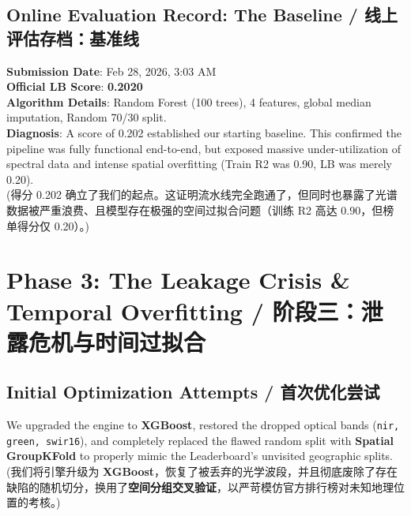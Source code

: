 \subsection{Online Evaluation Record: The Baseline / 线上评估存档：基准线}
\begin{infobox}
\textbf{Submission Date}: Feb 28, 2026, 3:03 AM \\
\textbf{Official LB Score}: \textbf{0.2020} \\
\textbf{Algorithm Details}: Random Forest (100 trees), 4 features, global median imputation, Random 70/30 split.\\
\textbf{Diagnosis}: A score of 0.202 established our starting baseline. This confirmed the pipeline was fully functional end-to-end, but exposed massive under-utilization of spectral data and intense spatial overfitting (Train R2 was 0.90, LB was merely 0.20). \\
(得分 0.202 确立了我们的起点。这证明流水线完全跑通了，但同时也暴露了光谱数据被严重浪费、且模型存在极强的空间过拟合问题（训练 R2 高达 0.90，但榜单得分仅 0.20）。)
\end{infobox}

\section{Phase 3: The Leakage Crisis \& Temporal Overfitting / 阶段三：泄露危机与时间过拟合}

\subsection{Initial Optimization Attempts / 首次优化尝试}
We upgraded the engine to \textbf{XGBoost}, restored the dropped optical bands (\texttt{nir, green, swir16}), and completely replaced the flawed random split with \textbf{Spatial GroupKFold} to properly mimic the Leaderboard's unvisited geographic splits.
(我们将引擎升级为 \textbf{XGBoost}，恢复了被丢弃的光学波段，并且彻底废除了存在缺陷的随机切分，换用了\textbf{空间分组交叉验证}，以严苛模仿官方排行榜对未知地理位置的考核。)

